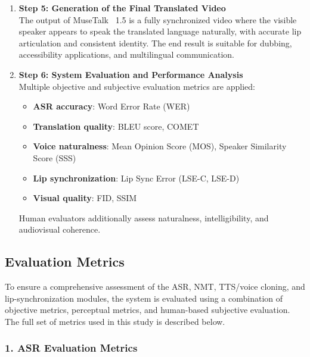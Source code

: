 \documentclass[12pt,oneside]{report}
\begin{document}
\begin{enumerate}
    \item \textbf{Step 5: Generation of the Final Translated Video}\\
    The output of MuseTalk~\cite{zhang2023musetalk} 1.5 is a fully synchronized video where the visible speaker appears to speak the translated language naturally, with accurate lip articulation and consistent identity.  
    The end result is suitable for dubbing, accessibility applications, and multilingual communication.

    \item \textbf{Step 6: System Evaluation and Performance Analysis}\\
    Multiple objective and subjective evaluation metrics are applied:  
    \begin{itemize}
        \item \textbf{ASR accuracy}: Word Error Rate (WER)  
        \item \textbf{Translation quality}: BLEU score, COMET  
        \item \textbf{Voice naturalness}: Mean Opinion Score (MOS), Speaker Similarity Score (SSS)  
        \item \textbf{Lip synchronization}: Lip Sync Error (LSE-C, LSE-D)  
        \item \textbf{Visual quality}: FID, SSIM  
    \end{itemize}
    Human evaluators additionally assess naturalness, intelligibility, and audiovisual coherence.
\end{enumerate}


\subsection{Evaluation Metrics}

To ensure a comprehensive assessment of the ASR, NMT, TTS/voice cloning, and lip-synchronization modules, the system is evaluated using a combination of objective metrics, perceptual metrics, and human-based subjective evaluation. The full set of metrics used in this study is described below.

\subsubsection*{1. ASR Evaluation Metrics}
\end{document}
